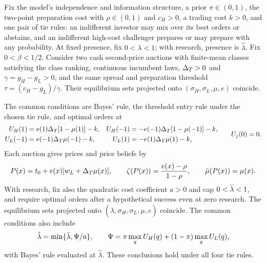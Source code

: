 \begin{lemma}\label{lem:reduction}
Fix the model's independence and information structure, a prior \(\pi\in(0,1)\), the two-point preparation cost
with \(\rho\in(0,1)\) and \(c_H>0\), a trading cost \(k>0\), and one pair of tie rules: an indifferent investor
may mix over its best orders or abstains, and an indifferent high-cost challenger prepares or may prepare with
any probability. At fixed presence, fix \(0<\lambda<1\); with research, presence is \(\hat\lambda\).
Fix \(0<\beta<1/2\). Consider two cash second-price auctions with finite-mean classes satisfying the class
ranking, continuous incumbent laws, \(\Delta_T>0\) and \(\gamma=g_H-g_L>0\), and the same spread and preparation threshold
\(\tau=(c_H-g_L)/\gamma\). Their equilibrium sets projected onto
\((\sigma_H,\sigma_L,\mu,e)\) coincide.

The common conditions are Bayes' rule, the threshold entry rule under the chosen tie rule, and optimal orders at
\[
\begin{aligned}
U_H(1)&=e(1)\Delta_T[1-\mu(1)]-k,& U_H(-1)&=-e(-1)\Delta_T[1-\mu(-1)]-k,\\
U_L(-1)&=e(-1)\Delta_T\mu(-1)-k,& U_L(1)&=-e(1)\Delta_T\mu(1)-k,
\end{aligned}
\qquad U_j(0)=0.
\]
Each auction gives prices and price beliefs by
\[
P(x)=t_0+e(x)[w_L+\Delta_T\mu(x)],\qquad
\zeta(P(x))=\frac{e(x)-\rho}{1-\rho},\qquad \bar\mu(P(x))=\mu(x).
\]
With research, fix also the quadratic cost coefficient \(a>0\) and cap \(0<\bar\lambda<1\), and require optimal orders
after a hypothetical success even at zero research. The equilibrium sets projected onto
\((\hat\lambda,\sigma_H,\sigma_L,\mu,e)\) coincide. The common conditions also include
\[
\hat\lambda=\min\{\bar\lambda,\Psi/a\},\qquad
\Psi=\pi\max_q U_H(q)+(1-\pi)\max_q U_L(q),
\]
with Bayes' rule evaluated at \(\hat\lambda\). These conclusions hold under all four tie rules.
\end{lemma}

